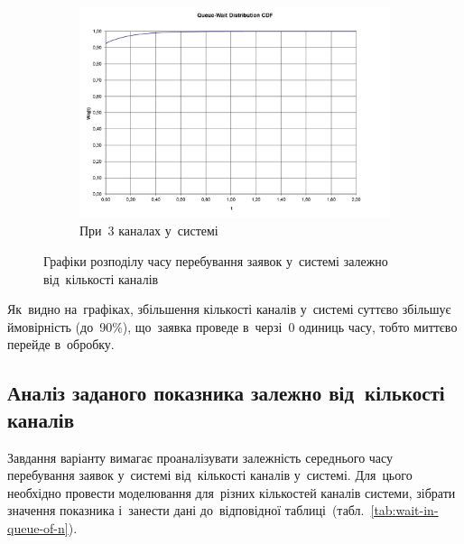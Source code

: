 \documentclass[
  a4paper,
  oneside,
  BCOR = 10mm,
  DIV = 12,
  12pt,
  headings = normal,
]{scrartcl}
\newlength{\gridunitwidth}
\begin{document}
\begin{figure}[!htbp]
\begin{subfigure}[b]{6 \gridunitwidth - 0.5 \gridunitwidth}
          \includegraphics[width = \columnwidth]{./assets/03-02.png}
          \caption{При~3 каналах у~системі}
          \label{subfig:time-dist-chart-03}
        \end{subfigure}
        \caption{Графіки розподілу часу перебування заявок у~системі залежно від~кількості каналів}
        \label{fig:time-dist-chart}
      \end{figure}

      Як~видно на~графіках, збільшення кількості каналів у~системі суттєво збільшує ймовірність (до~90\%), що~заявка проведе в~черзі~0 одиниць часу, тобто миттєво перейде в~обробку.

    \subsection{Аналіз заданого показника залежно від~кількості каналів}
      Завдання варіанту вимагає проаналізувати залежність середнього часу перебування заявок у~системі від~кількості каналів у~системі. Для~цього необхідно провести моделювання для~різних кількостей каналів системи, зібрати значення показника і~занести дані до~відповідної таблиці~(табл.~\ref{tab:wait-in-queue-of-n}).
\end{document}
